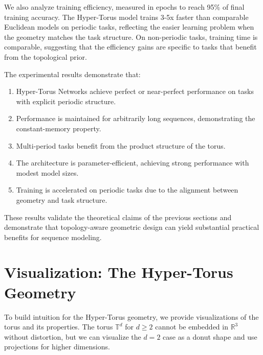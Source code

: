\documentclass[12pt,letterpaper,twoside]{article}
\newcommand{\R}{\mathbb{R}}
\newcommand{\T}{\mathbb{T}}
\begin{document}
We also analyze training efficiency, measured in epochs to reach 95\% of final training accuracy. The Hyper-Torus model trains 3-5x faster than comparable Euclidean models on periodic tasks, reflecting the easier learning problem when the geometry matches the task structure. On non-periodic tasks, training time is comparable, suggesting that the efficiency gains are specific to tasks that benefit from the topological prior.

The experimental results demonstrate that:
\begin{enumerate}
    \item Hyper-Torus Networks achieve perfect or near-perfect performance on tasks with explicit periodic structure.
    \item Performance is maintained for arbitrarily long sequences, demonstrating the constant-memory property.
    \item Multi-period tasks benefit from the product structure of the torus.
    \item The architecture is parameter-efficient, achieving strong performance with modest model sizes.
    \item Training is accelerated on periodic tasks due to the alignment between geometry and task structure.
\end{enumerate}

These results validate the theoretical claims of the previous sections and demonstrate that topology-aware geometric design can yield substantial practical benefits for sequence modeling.

\section{Visualization: The Hyper-Torus Geometry}
To build intuition for the Hyper-Torus geometry, we provide visualizations of the torus and its properties. The torus $\T^d$ for $d \geq 2$ cannot be embedded in $\R^3$ without distortion, but we can visualize the $d=2$ case as a donut shape and use projections for higher dimensions.
\end{document}
